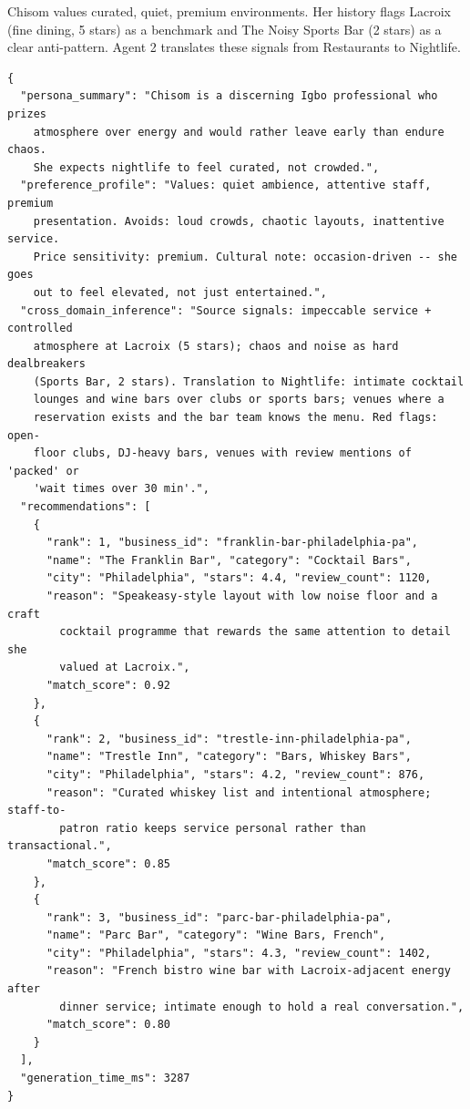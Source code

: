 \documentclass[11pt]{article}
\begin{document}
Chisom values curated, quiet, premium environments. Her history flags Lacroix (fine dining, 5 stars) as a benchmark and The Noisy Sports Bar (2 stars) as a clear anti-pattern. Agent 2 translates these signals from Restaurants to Nightlife.

{\footnotesize\begin{verbatim}
{
  "persona_summary": "Chisom is a discerning Igbo professional who prizes
    atmosphere over energy and would rather leave early than endure chaos.
    She expects nightlife to feel curated, not crowded.",
  "preference_profile": "Values: quiet ambience, attentive staff, premium
    presentation. Avoids: loud crowds, chaotic layouts, inattentive service.
    Price sensitivity: premium. Cultural note: occasion-driven -- she goes
    out to feel elevated, not just entertained.",
  "cross_domain_inference": "Source signals: impeccable service + controlled
    atmosphere at Lacroix (5 stars); chaos and noise as hard dealbreakers
    (Sports Bar, 2 stars). Translation to Nightlife: intimate cocktail
    lounges and wine bars over clubs or sports bars; venues where a
    reservation exists and the bar team knows the menu. Red flags: open-
    floor clubs, DJ-heavy bars, venues with review mentions of 'packed' or
    'wait times over 30 min'.",
  "recommendations": [
    {
      "rank": 1, "business_id": "franklin-bar-philadelphia-pa",
      "name": "The Franklin Bar", "category": "Cocktail Bars",
      "city": "Philadelphia", "stars": 4.4, "review_count": 1120,
      "reason": "Speakeasy-style layout with low noise floor and a craft
        cocktail programme that rewards the same attention to detail she
        valued at Lacroix.",
      "match_score": 0.92
    },
    {
      "rank": 2, "business_id": "trestle-inn-philadelphia-pa",
      "name": "Trestle Inn", "category": "Bars, Whiskey Bars",
      "city": "Philadelphia", "stars": 4.2, "review_count": 876,
      "reason": "Curated whiskey list and intentional atmosphere; staff-to-
        patron ratio keeps service personal rather than transactional.",
      "match_score": 0.85
    },
    {
      "rank": 3, "business_id": "parc-bar-philadelphia-pa",
      "name": "Parc Bar", "category": "Wine Bars, French",
      "city": "Philadelphia", "stars": 4.3, "review_count": 1402,
      "reason": "French bistro wine bar with Lacroix-adjacent energy after
        dinner service; intimate enough to hold a real conversation.",
      "match_score": 0.80
    }
  ],
  "generation_time_ms": 3287
}
\end{verbatim}}
\end{document}
